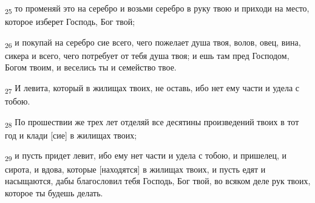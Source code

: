 \begin{tcolorbox}
\textsubscript{25} то променяй это на серебро и возьми серебро в руку твою и приходи на место, которое изберет Господь, Бог твой;
\end{tcolorbox}
\begin{tcolorbox}
\textsubscript{26} и покупай на серебро сие всего, чего пожелает душа твоя, волов, овец, вина, сикера и всего, чего потребует от тебя душа твоя; и ешь там пред Господом, Богом твоим, и веселись ты и семейство твое.
\end{tcolorbox}
\begin{tcolorbox}
\textsubscript{27} И левита, который в жилищах твоих, не оставь, ибо нет ему части и удела с тобою.
\end{tcolorbox}
\begin{tcolorbox}
\textsubscript{28} По прошествии же трех лет отделяй все десятины произведений твоих в тот год и клади [сие] в жилищах твоих;
\end{tcolorbox}
\begin{tcolorbox}
\textsubscript{29} и пусть придет левит, ибо ему нет части и удела с тобою, и пришелец, и сирота, и вдова, которые [находятся] в жилищах твоих, и пусть едят и насыщаются, дабы благословил тебя Господь, Бог твой, во всяком деле рук твоих, которое ты будешь делать.
\end{tcolorbox}
